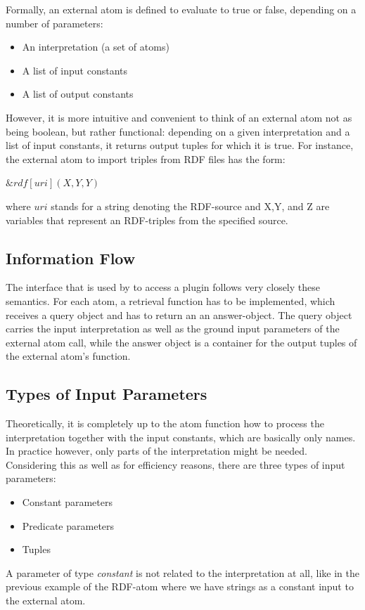 \documentclass[a4paper, titlepage]{article}
\newcommand{\ext}[3]{\ensuremath{\&{#1}[#2](#3)}}
\begin{document}
Formally, an external atom is defined to evaluate to true
or false, depending on a number of parameters:
\begin{itemize}
\item An interpretation (a set of atoms)
\item A list of input constants
\item A list of output constants
\end{itemize}  
However, it is more intuitive and convenient to think of an 
external atom not as being boolean, but rather functional:
depending on a given interpretation and a list of input 
constants, it returns output tuples for which it is true. For instance, the 
external atom to import triples from RDF files has the 
form: \\
\centerline{$\ext{rdf}{uri}{X,Y,Y}$} 
where $\mathit{uri}$ stands for a string denoting the RDF-source and X,Y, and Z are variables that represent an RDF-triples from the specified source.

\subsection{Information Flow}
The interface that is used by \dlvhex{} to access a plugin 
follows very closely these semantics. For each atom, a 
retrieval function has to be implemented, which receives a 
query object and has to return an an answer-object. The 
query object carries the input interpretation as well as 
the ground input parameters of the external atom call, 
while the answer object is a container for the output 
tuples of the external atom's function.   

\subsection{Types of Input Parameters}
Theoretically, it is completely up to the atom function how 
to process the interpretation together with the input 
constants,
which are basically only names. In practice however, only 
parts of the interpretation might be needed. Considering 
this as well as for efficiency reasons, there are three types of input parameters: 
\begin{itemize}
\item Constant parameters
\item Predicate parameters
\item Tuples
\end{itemize}

A parameter of type \emph{constant} is not related to the 
interpretation at all, like in the previous example of the 
RDF-atom where we have strings as a constant input to the external atom. 
\end{document}
